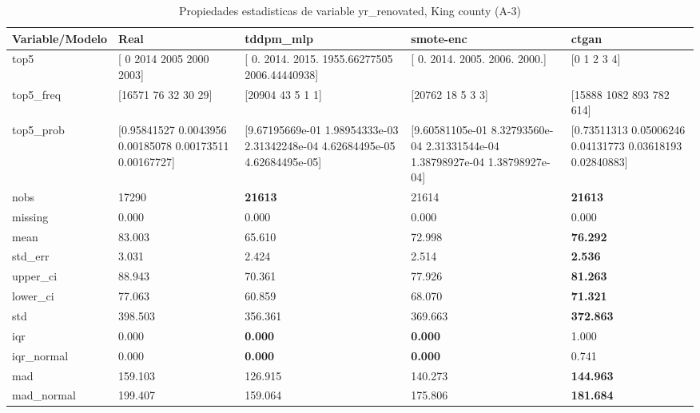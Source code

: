 \begin{table}[H]
\centering
\fontsize{8}{14}\selectfont
\caption{Propiedades  estadisticas de variable yr\_renovated, King county (A-3)}
\label{table-stats-king county-a-3-yr_renovated}
\begin{tabular}{|l|m{10em}|m{10em}|m{10em}|m{10em}|}
\hline
 \rowcolor[gray]{0.8}
Variable/Modelo & Real & tddpm\_mlp & smote-enc & ctgan \\
\hline top5 & [   0 2014 2005 2000 2003] & [   0.         2014.         2015.         1955.66277505 2006.44440938] & [   0. 2014. 2005. 2006. 2000.] & [0 1 2 3 4] \\
\hline top5\_freq & [16571    76    32    30    29] & [20904    43     5     1     1] & [20762    18     5     3     3] & [15888  1082   893   782   614] \\
\hline top5\_prob & [0.95841527 0.0043956  0.00185078 0.00173511 0.00167727] & [9.67195669e-01 1.98954333e-03 2.31342248e-04 4.62684495e-05
 4.62684495e-05] & [9.60581105e-01 8.32793560e-04 2.31331544e-04 1.38798927e-04
 1.38798927e-04] & [0.73511313 0.05006246 0.04131773 0.03618193 0.02840883] \\
\hline nobs & 17290 & \bfseries 21613 & \cellcolor[rgb]{0.9, 0.54, 0.52} 21614 & \bfseries 21613 \\
\hline missing & 0.000 & 0.000 & 0.000 & 0.000 \\
\hline mean & 83.003 & \cellcolor[rgb]{0.9, 0.54, 0.52} 65.610 & 72.998 & \bfseries 76.292 \\
\hline std\_err & 3.031 & \cellcolor[rgb]{0.9, 0.54, 0.52} 2.424 & 2.514 & \bfseries 2.536 \\
\hline upper\_ci & 88.943 & \cellcolor[rgb]{0.9, 0.54, 0.52} 70.361 & 77.926 & \bfseries 81.263 \\
\hline lower\_ci & 77.063 & \cellcolor[rgb]{0.9, 0.54, 0.52} 60.859 & 68.070 & \bfseries 71.321 \\
\hline std & 398.503 & \cellcolor[rgb]{0.9, 0.54, 0.52} 356.361 & 369.663 & \bfseries 372.863 \\
\hline iqr & 0.000 & \bfseries 0.000 & \bfseries 0.000 & \cellcolor[rgb]{0.9, 0.54, 0.52} 1.000 \\
\hline iqr\_normal & 0.000 & \bfseries 0.000 & \bfseries 0.000 & \cellcolor[rgb]{0.9, 0.54, 0.52} 0.741 \\
\hline mad & 159.103 & \cellcolor[rgb]{0.9, 0.54, 0.52} 126.915 & 140.273 & \bfseries 144.963 \\
\hline mad\_normal & 199.407 & \cellcolor[rgb]{0.9, 0.54, 0.52} 159.064 & 175.806 & \bfseries 181.684 \\

\end{tabular}
\end{table}

